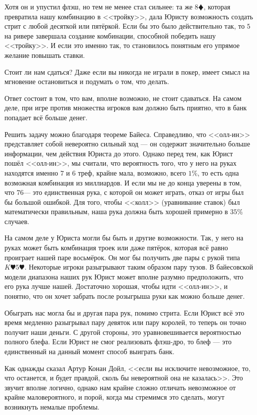 Хотя он и упустил флэш, но тем не менее стал сильнее: та же $8\vardiamond$, которая превратила нашу комбинацию в <<тройку>>, дала Юристу возможность создать стрит с любой десяткой или пятёркой. Если бы это было действительно так, то $5$\spadesuit на ривере завершала создание комбинации, способной победить нашу <<тройку>>. И если это именно так, то становилось понятным его упрямое желание повышать ставки.

Стоит ли нам сдаться? Даже если вы никогда не играли в покер, имеет смысл на мгновение остановиться и подумать о том, что делать.

Ответ состоит в том, что вам, вполне возможно, не стоит сдаваться. На самом деле, при игре против множества игроков вам должно быть приятно, что в банк попадает всё больше денег.

Решить задачу можно благодаря теореме Байеса. Справедливо, что <<олл-ин>> представляет собой невероятно сильный ход --- он содержит значительно больше информации, чем действия Юриста до этого. Однако перед тем, как Юрист пошёл <<олл-ин>>, мы считали, что вероятность того, что у него на руках находятся именно $7$ и $6$ треф, крайне мала, возможно, всего $1\%$, то есть одна возможная комбинация из миллиардов. И если мы не до конца уверены в том, что $7$\clubsuit  $6$\clubsuit --- это единственная рука, с которой он может играть, отказ от игры был бы большой ошибкой. Для того, чтобы <<колл>> (уравнивание ставок) был математически правильным, наша рука должна быть хорошей примерно в $35\%$ случаев.

На самом деле у Юриста могли бы быть и другие возможности. Так, у него на руках может быть комбинация троек или даже пятёрок, которая всё равно проиграет нашей паре восьмёрок. Он мог бы получить две пары с рукой типа $K\varheart 5\varheart$. Некоторые игроки разыгрывают таким образом пару тузов. В байесовской модели диапазона наших рук Юрист может вполне разумно предположить, что его рука лучше нашей. Достаточно хорошая, чтобы идти <<олл-ин>>, и понятно, что он хочет забрать после розыгрыша руки как можно больше денег.

Обыграть нас могла бы и другая пара рук, помимо стрита. Если Юрист всё это время медленно разыгрывал пару девяток или пару королей, то теперь он точно получит наши деньги. С другой стороны, это уравновешивается вероятностью полного блефа. Если Юрист не смог реализовать флэш-дро, то блеф --- это единственный на данный момент способ выиграть банк.

Как однажды сказал Артур Конан Дойл, <<если вы исключите невозможное, то, что останется, и будет правдой, сколь бы невероятной она не казалась>>. Это звучит вполне логично, однако нам крайне сложно отличать невозможное от крайне маловероятного, и порой, когда мы стремимся это сделать, могут возникнуть немалые проблемы.

